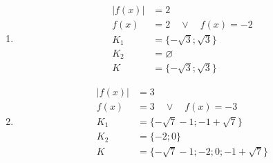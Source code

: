 \documentclass[11pt,a4paper]{article}
\begin{document}
\begin{zadaniReseniBox}[title={Domácí úkol}]
\begin{enumerate}[label=\alph*),itemsep=2pt]
\item
\[\begin{aligned}
|f(x)|&=2\\[2pt]
f(x)&=2\quad\vee\quad f(x)=-2\\[2pt]
K_1&=\{- \sqrt{3};\sqrt{3}\}\\[2pt]
K_2&=\varnothing\\[2pt]
K&=\{- \sqrt{3};\sqrt{3}\}
\end{aligned}\]
\item
\[\begin{aligned}
|f(x)|&=3\\[2pt]
f(x)&=3\quad\vee\quad f(x)=-3\\[2pt]
K_1&=\{- \sqrt{7} - 1;-1 + \sqrt{7}\}\\[2pt]
K_2&=\{-2;0\}\\[2pt]
K&=\{- \sqrt{7} - 1;-2;0;-1 + \sqrt{7}\}
\end{aligned}\]
\end{enumerate}
\end{zadaniReseniBox}
\end{document}
